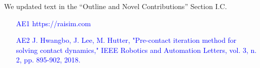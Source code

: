 We updated text in the ``Outline and Novel Contributions'' Section I.C.

\vspace{5mm}
\textcolor{blue}{\begin{itemize}
    \item[AE1] https://raisim.com
    \item[AE2] J. Hwangbo, J. Lee, M. Hutter, "Pre-contact iteration method for
solving contact dynamics," IEEE Robotics and Automation Letters, vol. 3, n. 2,
pp. 895-902, 2018.\end{itemize}} 


